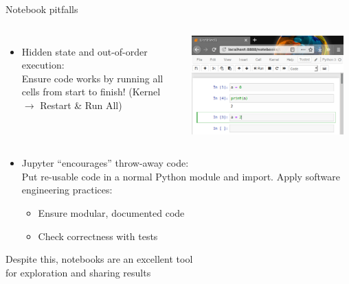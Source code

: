 \documentclass[aspectratio=169,usenames,dvipsnames]{beamer}
\begin{document}
\begin{frame}{Notebook pitfalls}
    \begin{columns}
            \begin{itemize}
                \item Hidden state and out-of-order execution:\\
                    Ensure code works by running all cells from start to finish!
                    (Kernel $\rightarrow$ Restart \& Run All)
            \end{itemize}
            \includegraphics[width=0.95\textwidth]{fig/nboutoforder}
    \end{columns}
    \pause
    \begin{itemize}
        \item Jupyter ``encourages'' throw-away code:\\
                Put re-usable code in a normal Python module and import.
                Apply software engineering practices:
                \begin{itemize}
                    \item Ensure modular, documented code
                    \item Check correctness with tests
                \end{itemize}
    \end{itemize}

    Despite this, notebooks are an excellent tool \\
    for exploration and sharing results
\end{frame}
\end{document}
